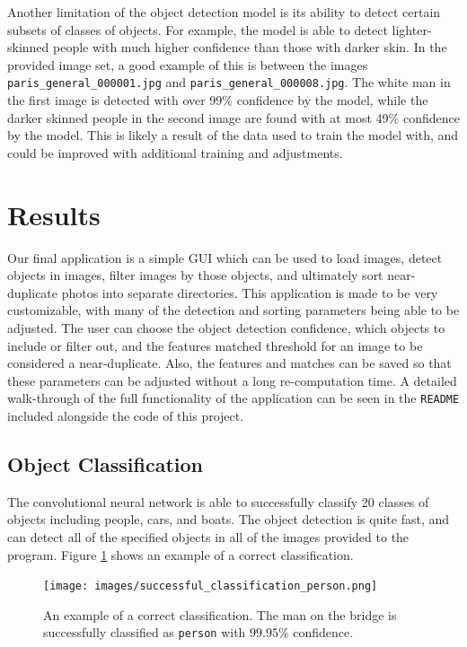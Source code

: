 \documentclass[12pt]{article}
\begin{document}
	Another limitation of the object detection model is its ability to detect certain subsets of classes of objects. For example, the model is able to detect lighter-skinned people with much higher confidence than those with darker skin. In the provided image set, a good example of this is between the images \texttt{paris\_general\_000001.jpg} and \texttt{paris\_general\_000008.jpg}. The white man in the first image is detected with over 99\% confidence by the model, while the darker skinned people in the second image are found with at most 49\% confidence by the model. This is likely a result of the data used to train the model with, and could be improved with additional training and adjustments.
	
\section{Results}
Our final application is a simple GUI which can be used to load images, detect objects in images, filter images by those objects, and ultimately sort near-duplicate photos into separate directories. This application is made to be very customizable, with many of the detection and sorting parameters being able to be adjusted. The user can choose the object detection confidence, which objects to include or filter out, and the features matched threshold for an image to be considered a near-duplicate. Also, the features and matches can be saved so that these parameters can be adjusted without a long re-computation time. A detailed walk-through of the full functionality of the application can be seen in the \texttt{README} included alongside the code of this project.

\subsection{Object Classification}
The convolutional neural network is able to successfully classify 20 classes of objects including people, cars, and boats. The object detection is quite fast, and can detect all of the specified objects in all of the images provided to the program. Figure \ref{fig:correct_classification} shows an example of a correct classification.
\begin{figure}[H]
	\centering
	\texttt{[image: images/successful\_classification\_person.png]}
	\caption{An example of a correct classification. The man on the bridge is successfully classified as \texttt{person} with $99.95\%$ confidence.}
	\label{fig:correct_classification}
\end{figure}
\end{document}
